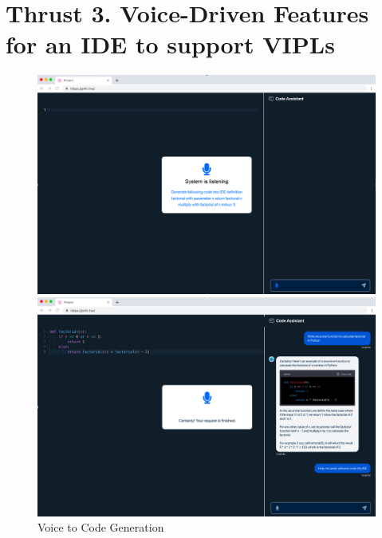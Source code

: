 \section{Thrust 3. Voice-Driven Features for an IDE to support VIPLs}
\label{sec:thrust3}

\begin{figure}[t]
\centering
\begin{minipage}{.48\textwidth}
\centering
\includegraphics[width=.98\textwidth]{p4h-1}
\end{minipage}
\begin{minipage}{.48\textwidth}
\centering
\includegraphics[width=.98\textwidth]{p4h-2}
\end{minipage}  
\caption{Voice to Code Generation}
\label{thrust3-one}
\end{figure}

